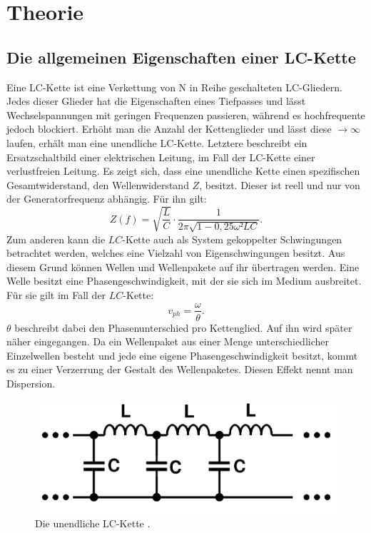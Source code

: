 
\section{Theorie}
\label{sec:Theorie}

\subsection{Die allgemeinen Eigenschaften einer LC-Kette}
Eine LC-Kette ist eine Verkettung von N in Reihe geschalteten LC-Gliedern.
 Jedes dieser Glieder hat die Eigenschaften eines Tiefpasses und lässt
  Wechselspannungen mit geringen Frequenzen passieren, während es hochfrequente jedoch
   blockiert. Erhöht man die Anzahl der Kettenglieder und lässt
   diese $\to \infty$ laufen, erhält man eine unendliche LC-Kette. Letztere
    beschreibt ein Ersatzschaltbild einer elektrischen Leitung, im Fall der
     LC-Kette einer verlustfreien Leitung. Es zeigt sich, dass eine unendliche
      Kette einen spezifischen Gesamtwiderstand, den Wellenwiderstand $Z$, besitzt.
      Dieser ist reell und nur von der Generatorfrequenz abhängig. Für ihn gilt:
      \begin{equation}
        Z(f) = \sqrt{\frac{L}{C}} \cdot \frac{1}{2\pi \sqrt{1-0,25\omega² LC}}\text{.}
      \end{equation}
 Zum anderen kann die $LC$-Kette auch als System gekoppelter
    Schwingungen betrachtet werden, welches eine Vielzahl von Eigenschwingungen besitzt.
      Aus diesem Grund können Wellen und Wellenpakete auf ihr übertragen werden.
	Eine Welle besitzt eine Phasengeschwindigkeit, mit der sie sich im Medium ausbreitet. Für sie gilt im Fall der $LC$-Kette:
\begin{equation}
v_{ph} = \frac{\omega}{\theta}\text{.}
\end{equation}
	$\theta$ beschreibt dabei den Phasenunterschied pro Kettenglied. Auf ihn wird später näher eingegangen.
     Da ein Wellenpaket aus einer Menge unterschiedlicher Einzelwellen besteht
      und jede eine eigene Phasengeschwindigkeit besitzt, kommt es zu einer Verzerrung
  der Gestalt des Wellenpaketes. Diesen Effekt nennt man Dispersion.
     \begin{figure}[H]
       \centering
       \includegraphics[width=\linewidth-200pt,height=\textheight-200pt,keepaspectratio]{content/Grafiken/LCKette.png}
       \caption{Die unendliche LC-Kette \cite{V356}.}
       \label{fig:LC-Kette}
     \end{figure}

